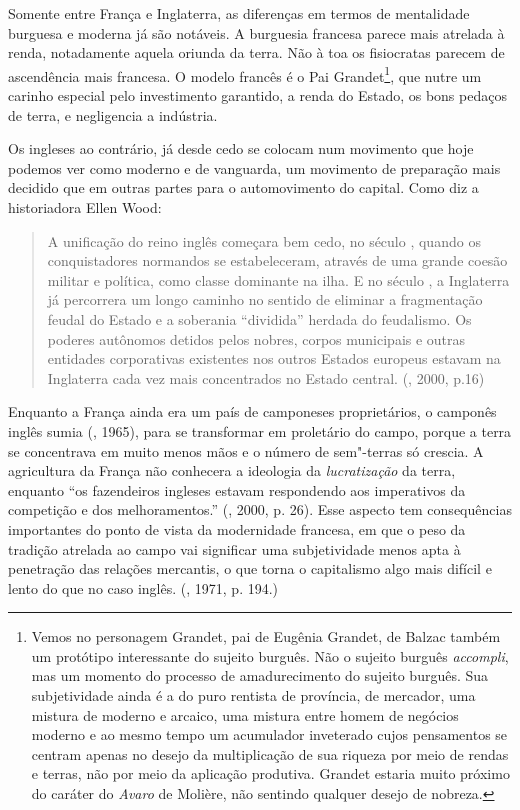 Somente entre França e Inglaterra, as diferenças em termos de
mentalidade burguesa e moderna já são notáveis. A burguesia francesa
parece mais atrelada à renda, notadamente aquela oriunda da terra. Não à
toa os fisiocratas parecem de ascendência mais francesa. O modelo
francês é o Pai Grandet\footnote{Vemos no personagem Grandet, pai de
  Eugênia Grandet, de Balzac também um protótipo interessante do sujeito
  burguês. Não o sujeito burguês \emph{accompli}, mas um momento do
  processo de amadurecimento do sujeito burguês. Sua subjetividade ainda
  é a do puro rentista de província, de mercador, uma mistura de moderno
  e arcaico, uma mistura entre homem de negócios moderno e ao mesmo
  tempo um acumulador inveterado cujos pensamentos se centram apenas no
  desejo da multiplicação de sua riqueza por meio de rendas e terras,
  não por meio da aplicação produtiva. Grandet estaria muito próximo do
  caráter do \emph{Avaro} de Molière, não sentindo qualquer desejo de
  nobreza.}, que nutre um carinho especial pelo investimento garantido,
a renda do Estado, os bons pedaços de terra, e negligencia a indústria.

Os ingleses ao contrário, já desde cedo se colocam num movimento que
hoje podemos ver como moderno e de vanguarda, um movimento de preparação
mais decidido que em outras partes para o automovimento do capital. Como
diz a historiadora Ellen Wood:

\begin{quote}
A unificação do reino inglês começara bem cedo, no século , quando os
conquistadores normandos se estabeleceram, através de uma grande coesão
militar e política, como classe dominante na ilha. E no século , a
Inglaterra já percorrera um longo caminho no sentido de eliminar a
fragmentação feudal do Estado e a soberania ``dividida'' herdada do
feudalismo. Os poderes autônomos detidos pelos nobres, corpos municipais
e outras entidades corporativas existentes nos outros Estados europeus
estavam na Inglaterra cada vez mais concentrados no Estado central.
(, 2000, p.16)
\end{quote}

Enquanto a França ainda era um país de camponeses proprietários, o
camponês inglês sumia (, 1965), para se transformar em
proletário do campo, porque a terra se concentrava em muito menos mãos e
o número de sem"-terras só crescia. A agricultura da França não conhecera
a ideologia da \emph{lucratização} da terra, enquanto ``os fazendeiros
ingleses estavam respondendo aos imperativos da competição e dos
melhoramentos.'' (, 2000, p. 26). Esse aspecto tem consequências
importantes do ponto de vista da modernidade francesa, em que o peso da
tradição atrelada ao campo vai significar uma subjetividade menos apta à
penetração das relações mercantis, o que torna o capitalismo algo mais
difícil e lento do que no caso inglês. (, 1971, p. 194.)

